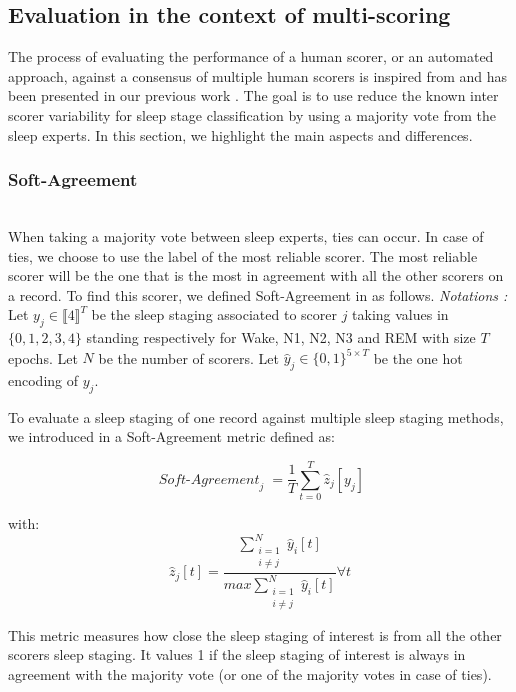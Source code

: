 \documentclass[journal]{IEEEtran}
\begin{document}
\subsection{Evaluation in the context of multi-scoring}
\label{sec:multiscoring}

The process of evaluating the performance of a human scorer, or an automated approach, against a consensus of multiple human scorers is inspired from \cite{Stephansen2018} and has been presented in our previous work \cite{Arnal662734}. The goal is to use reduce the known inter scorer variability for sleep stage classification by using a majority vote from the sleep experts. In this section, we highlight the main aspects and differences.

\newcommand{\varB}[1]{{\operatorname{\mathit{#1}}}}
\subsubsection*{Soft-Agreement}\hfill\\
When taking a majority vote between sleep experts, ties can occur. In case of ties, we choose to use the label of the most reliable scorer. The most reliable scorer will be the one that is the most in agreement with all the other scorers on a record. To find this scorer, we defined Soft-Agreement in \cite{Arnal662734} as follows.
\textit{Notations : }Let $y_j \in \llbracket 4 \rrbracket^{T}$ be the sleep staging associated to scorer $j$ taking values in $\{ 0, 1, 2, 3, 4 \}$ standing respectively for Wake, N1, N2, N3 and REM with size $T$ epochs. Let $N$ be the number of scorers. Let $\hat{y}_j \in \{ 0, 1 \}^{5 \times T}$ be the one hot encoding of $y_j$.

To evaluate a sleep staging of one record against multiple sleep staging methods, we introduced in \cite{Arnal662734} a Soft-Agreement metric defined as:

\begin{equation*}
        \varB{Soft-Agreement}_j = \frac{1}{T}\sum_{t=0}^{T}\hat{z}_j[y_j]
\end{equation*}

with:
\begin{equation*}
    \hat{z}_j[t] = \frac{\sum\limits_{\substack{i = 1 \\ i \neq j }}^{N}\hat{y}_i[t]}{max \sum\limits_{\substack{i = 1 \\ i \neq j }}^{N}\hat{y}_i[t]} \forall t
\end{equation*}

This metric measures how close the sleep staging of interest is from all the other scorers sleep staging. It values 1 if the sleep staging of interest is always in agreement with the majority vote (or one of the majority votes in case of ties).
\end{document}

